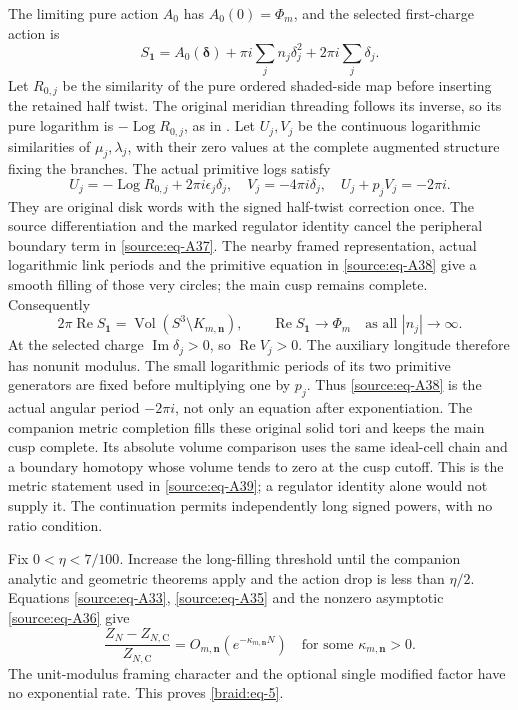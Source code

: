 \documentclass[11pt]{article}
\numberwithin{equation}{section}
\begin{document}
The limiting pure action \(A_0\) has \(A_0(0)=\Phi_m\), and the selected
first-charge action is \begin{equation}\label{source:eq-A37}
S_{\mathbf1}=A_0(\boldsymbol\delta)
           +\pi i\sum_jn_j\delta_j^2+2\pi i\sum_j\delta_j.
\end{equation} Let \(R_{0,j}\) be the similarity of the pure ordered
shaded-side map before inserting the retained half twist. The original
meridian threading follows its inverse, so its pure logarithm is
\(-\operatorname{Log}R_{0,j}\), as in
\cite[Section 4]{MarkedFillings}. Let
\(U_j,V_j\) be the continuous logarithmic similarities of
\(\mu_j,\lambda_j\), with their zero values at the complete augmented
structure fixing the branches. The actual primitive logs satisfy \begin{equation}\label{source:eq-A38}
U_j=-\operatorname{Log}R_{0,j}+2\pi i\epsilon_j\delta_j,
 \quad V_j=-4\pi i\delta_j,
 \quad U_j+p_jV_j=-2\pi i.
\end{equation} They are original disk words with the signed half-twist correction
once. The source differentiation and the marked regulator identity
cancel the peripheral boundary term in \eqref{source:eq-A37}. The nearby framed
representation, actual logarithmic link periods and the primitive
equation in \eqref{source:eq-A38} give a smooth filling of those very circles; the main
cusp remains complete. Consequently \begin{equation}\label{source:eq-A39}
2\pi\operatorname{Re}S_{\mathbf1}
       =\operatorname{Vol}(S^3\setminus K_{m,\mathbf n}),
 \qquad \operatorname{Re}S_{\mathbf1}\longrightarrow\Phi_m
 \quad\text{as all }|n_j|\to\infty.
\end{equation} At the selected charge \(\operatorname{Im}\delta_j>0\),
so \(\operatorname{Re}V_j>0\). The auxiliary longitude therefore has
nonunit modulus. The small logarithmic periods of its two primitive
generators are fixed before multiplying one by \(p_j\). Thus
\eqref{source:eq-A38} is the actual angular period \(-2\pi i\), not
only an equation after exponentiation. The companion metric completion
fills these original solid tori and keeps the main cusp complete. Its
absolute volume comparison uses the same ideal-cell chain and a
boundary homotopy whose volume tends to zero at the cusp cutoff.
This is the metric statement used in \eqref{source:eq-A39}; a regulator
identity alone would not supply it. The continuation permits
independently long signed powers, with no ratio condition.

Fix \(0<\eta<7/100\). Increase the long-filling threshold until the companion
analytic and geometric theorems apply and the action drop is less than \(\eta/2\).
Equations \eqref{source:eq-A33}, \eqref{source:eq-A35} and the nonzero asymptotic \eqref{source:eq-A36} give \begin{equation}\label{source:eq-A40}
\frac{Z_N-Z_{N,\mathrm C}}{Z_{N,\mathrm C}}
       =O_{m,\mathbf n}(e^{-\kappa_{m,\mathbf n}N})
       \quad\text{for some }\kappa_{m,\mathbf n}>0.
\end{equation} The unit-modulus framing character and the optional single modified
factor have no exponential rate. This proves \eqref{braid:eq-5}.
\end{document}
